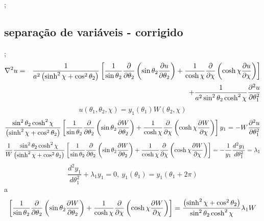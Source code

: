 \documentclass[a4paper,12pt]{article}
\begin{document}
;

\subsection{separa\c{c}\~{a}o de vari\'{a}veis - corrigido}

;%
\begin{eqnarray*}
\nabla ^{2}u &=&\frac{1}{a^{2}\left( \sinh ^{2}\chi +\cos ^{2}\theta
_{2}\right) }\left[ \frac{1}{\sin \theta _{2}}\frac{\partial }{\partial
\theta _{2}}\left( \sin \theta _{2}\frac{\partial u}{\partial \theta _{2}}%
\right) +\frac{1}{\cosh \chi }\frac{\partial }{\partial \chi }\left( \cosh
\chi \frac{\partial u}{\partial \chi }\right) \right]  \\
&&+\frac{1}{a^{2}\sin ^{2}\theta _{2}\cosh ^{2}\chi }\frac{\partial ^{2}u}{%
\partial \theta _{1}^{2}}
\end{eqnarray*}%
\begin{equation*}
u\left( \theta _{1},\theta _{2},\chi \right) =y_{1}\left( \theta _{1}\right)
W\left( \theta _{2},\chi \right) 
\end{equation*}%
\begin{equation*}
\frac{\sin ^{2}\theta _{2}\cosh ^{2}\chi }{\left( \sinh ^{2}\chi +\cos
^{2}\theta _{2}\right) }\left[ \frac{1}{\sin \theta _{2}}\frac{\partial }{%
\partial \theta _{2}}\left( \sin \theta _{2}\frac{\partial W}{\partial
\theta _{2}}\right) +\frac{1}{\cosh \chi }\frac{\partial }{\partial \chi }%
\left( \cosh \chi \frac{\partial W}{\partial \chi }\right) \right] y_{1}=-W%
\frac{\partial ^{2}u}{\partial \theta _{1}^{2}}
\end{equation*}%
\begin{equation*}
\frac{1}{W}\frac{\sin ^{2}\theta _{2}\cosh ^{2}\chi }{\left( \sinh ^{2}\chi
+\cos ^{2}\theta _{2}\right) }\left[ \frac{1}{\sin \theta _{2}}\frac{%
\partial }{\partial \theta _{2}}\left( \sin \theta _{2}\frac{\partial W}{%
\partial \theta _{2}}\right) +\frac{1}{\cosh \chi }\frac{\partial }{\partial
\chi }\left( \cosh \chi \frac{\partial W}{\partial \chi }\right) \right] =-%
\frac{1}{y_{1}}\frac{d^{2}y_{1}}{d\theta _{1}^{2}}=\lambda _{1}
\end{equation*}%
\begin{equation*}
\frac{d^{2}y_{1}}{d\theta _{1}^{2}}+\lambda _{1}y_{1}=0,\ y_{1}\left( \theta
_{1}\right) =y_{1}\left( \theta _{1}+2\pi \right) 
\end{equation*}%
a%
\begin{equation*}
\left[ \frac{1}{\sin \theta _{2}}\frac{\partial }{\partial \theta _{2}}%
\left( \sin \theta _{2}\frac{\partial W}{\partial \theta _{2}}\right) +\frac{%
1}{\cosh \chi }\frac{\partial }{\partial \chi }\left( \cosh \chi \frac{%
\partial W}{\partial \chi }\right) \right] =\frac{\left( \sinh ^{2}\chi
+\cos ^{2}\theta _{2}\right) }{\sin ^{2}\theta _{2}\cosh ^{2}\chi }\lambda
_{1}W
\end{equation*}%
\end{document}
